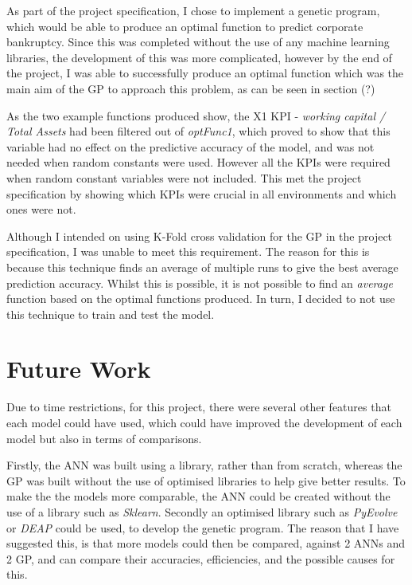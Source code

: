 \documentclass[11pt]{article}
\begin{document}
As part of the project specification, I chose to implement a genetic program, which would be able to produce an optimal function to predict corporate bankruptcy. Since this was completed without the use of any machine learning libraries, the development of this was more complicated, however by the end of the project, I was able to successfully produce an optimal function which was the main aim of the GP to approach this problem, as can be seen in section (?) 

As the two example functions produced show, the X1 KPI - \textit{working capital / Total Assets} had been filtered out of \textit{optFunc1}, which proved to show that this variable had no effect on the predictive accuracy of the model, and was not needed when random constants were used. However all the KPIs were required when random constant variables were not included. This met the project specification by showing which KPIs were crucial in all environments and which ones were not. 

Although I intended on using K-Fold cross validation for the GP in the project specification, I was unable to meet this requirement. The reason for this is because this technique finds an average of multiple runs to give the best average prediction accuracy. Whilst this is possible, it is not possible to find an \textit{average} function based on the optimal functions produced. In turn, I decided to not use this technique to train and test the model. 





\newpage
\section{Future Work}
Due to time restrictions, for this project, there were several other features that each model could have used, which could have improved the development of each model but also in terms of comparisons. 

Firstly, the ANN was built using a library, rather than from scratch, whereas the GP was built without the use of optimised libraries to help give better results. To make the the models more comparable, the ANN could be created without the use of a library such as \textit{Sklearn}. Secondly an optimised library such as \textit{PyEvolve} or \textit{DEAP} could be used, to develop the genetic program. The reason that I have suggested this, is that more models could then be compared, against 2 ANNs and 2 GP, and can compare their accuracies, efficiencies, and the possible causes for this. 
\end{document}
